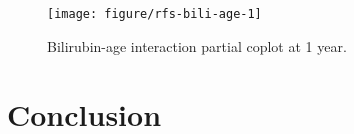 \documentclass[nojss]{jss}\usepackage[]{graphicx}\usepackage[]{color}
\begin{document}
\begin{Schunk}
\begin{figure}[!htpb]

{\centering \texttt{[image: figure/rfs-bili-age-1]} 

}

\caption[Bilirubin-age interaction partial coplot at 1 year]{Bilirubin-age interaction partial coplot at 1 year.\label{fig:bili-age}}
\end{figure}
\end{Schunk}
\section{Conclusion}



\end{document}

